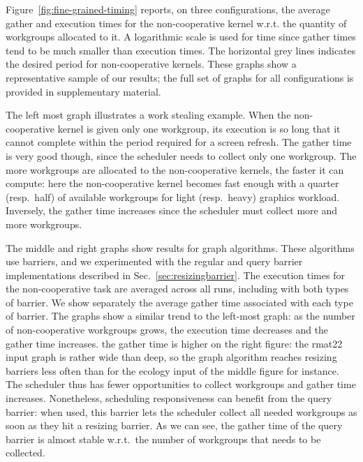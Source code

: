 \documentclass[parskip=half,sigconf,review, anonymous=true, acmcopyrightmode=none]{acmart}
\newcommand{\myfiglong}{Figure~}
\newcommand{\mysec}{Sec.~}
\begin{document}
%
\myfiglong\ref{fig:fine-grained-timing} reports, on three
configurations, the average gather and execution times for the
non-cooperative kernel w.r.t. the quantity of workgroups allocated to
it.  A logarithmic scale is used for time since gather times tend to
be much smaller than execution times. The horizontal grey lines
indicates the desired period for non-cooperative kernels.  These
graphs show a representative sample of our results; the full set of
graphs for all configurations is provided in supplementary material.

The left most graph illustrates a work
stealing example.  When the non-cooperative kernel is given only one
workgroup, its execution is so long that it cannot complete within the
period required for a screen refresh. The gather time is very good
though, since the scheduler needs to collect only one workgroup.  The
more workgroups are allocated to the non-cooperative kernels, the
faster it can compute: here the non-cooperative kernel becomes fast
enough with a quarter (resp.\ half) of available workgroups for light
(resp.\ heavy) graphics workload. Inversely, the gather time increases
since the scheduler must collect more and more workgroups.

The middle and right graphs show results for graph algorithms.  These
algorithms use barriers, and we experimented with the regular and
query barrier implementations described in
\mysec\ref{sec:resizingbarrier}.  The execution times for the
non-cooperative task are averaged across all runs, including with both
types of barrier.  We show separately the average gather time
associated with each type of barrier.  The graphs show a similar trend
to the left-most graph: as the number of non-cooperative workgroups
grows, the execution time decreases and the gather time
increases.%
%
the gather time is higher on the right figure: the rmat22 input graph
is rather wide than deep, so the graph algorithm reaches resizing
barriers less often than for the ecology input of the middle figure
for instance. The scheduler thus has fewer opportunities to collect
workgroups and gather time increases. Nonetheless, scheduling
responsiveness can benefit from the query barrier: when used, this
barrier lets the scheduler collect all needed workgroups as soon as
they hit a resizing barrier. As we can see, the gather time of the
query barrier is almost stable w.r.t.\ the number of workgroups that
needs to be collected.
\end{document}
